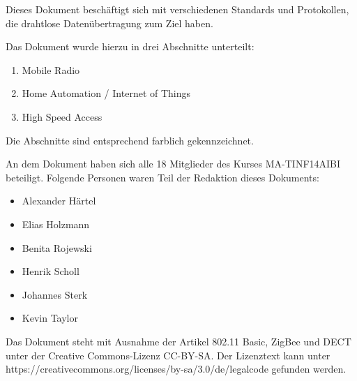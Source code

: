 \begin{minipage}{2.5cm}\hspace{2cm}\end{minipage}\begin{minipage}{14.5cm}
\vspace{15cm}
Dieses Dokument beschäftigt sich mit verschiedenen Standards und Protokollen, die drahtlose Datenübertragung zum Ziel haben.

Das Dokument wurde hierzu in drei Abschnitte unterteilt:
\begin{enumerate}
\item \textcolor{mobile}{Mobile Radio}
\item \textcolor{iot}{Home Automation / Internet of Things}
\item \textcolor{access}{High Speed Access}
\end{enumerate}
Die Abschnitte sind entsprechend farblich gekennzeichnet.

An dem Dokument haben sich alle 18 Mitglieder des Kurses MA-TINF14AIBI beteiligt. Folgende Personen waren Teil der Redaktion dieses Dokuments:
\begin{itemize}
\item Alexander Härtel
\item Elias Holzmann
\item Benita Rojewski
\item Henrik Scholl
\item Johannes Sterk
\item Kevin Taylor
\end{itemize}

Das Dokument steht mit Ausnahme der Artikel 802.11 Basic, ZigBee und DECT unter der Creative Commons-Lizenz CC-BY-SA. Der Lizenztext kann unter https://creativecommons.org/licenses/by-sa/3.0/de/legalcode gefunden werden.
\end{minipage}

